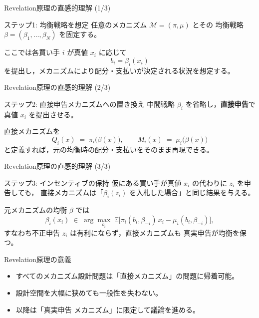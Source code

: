 \documentclass[dvipdfmx,autodetect-engine]{beamer}
\begin{document}
\begin{frame}{Revelation原理の直感的理解 (1/3)}
  \begin{block}{ステップ1: 均衡戦略を想定}
    任意のメカニズム $\mathcal{M}=(\pi,\mu)$ とその
    均衡戦略 $\beta=(\beta_1,\dots,\beta_N)$ を固定する。
  \end{block}
  \vspace{1ex}
  ここでは各買い手 $i$ が真値 $x_i$ に応じて
  \[
    b_i = \beta_i(x_i)
  \]
  を提出し，メカニズムにより配分・支払いが決定される状況を想定する。
\end{frame}

\begin{frame}{Revelation原理の直感的理解 (2/3)}
  \begin{block}{ステップ2: 直接申告メカニズムへの置き換え}
    中間戦略 $\beta_i$ を省略し，\textbf{直接申告}で
    真値 $x_i$ を提出させる。
  \end{block}
  \vspace{1ex}
  直接メカニズムを
  \[
    Q_i(x)\;=\;\pi_i\bigl(\beta(x)\bigr),\qquad 
    M_i(x)\;=\;\mu_i\bigl(\beta(x)\bigr)
  \]
  と定義すれば，元の均衡時の配分・支払いをそのまま再現できる。
\end{frame}

\begin{frame}{Revelation原理の直感的理解 (3/3)}
  \begin{block}{ステップ3: インセンティブの保持}
    仮にある買い手が真値 $x_i$ の代わりに $z_i$ を申告しても，
    直接メカニズムは「\(\beta_i(z_i)\) を入札した場合」と同じ結果を与える。
  \end{block}
  \vspace{1ex}
  元メカニズムの均衡 $\beta$ では
  \[
    \beta_i(x_i)\;\in\;\arg\max_{b_i}\;
    \mathbb{E}\bigl[\pi_i(b_i,\beta_{-i})\,x_i
      -\mu_i(b_i,\beta_{-i})\bigr],
  \]
  すなわち不正申告 \(z_i\) は有利にならず，直接メカニズムも
  真実申告が均衡を保つ。
\end{frame}

\begin{frame}{Revelation原理の意義}
  \begin{itemize}
    \item すべてのメカニズム設計問題は「直接メカニズム」の問題に帰着可能。
    \item 設計空間を大幅に狭めても一般性を失わない。
    \item 以降は「真実申告
    メカニズム」に限定して議論を進める。
  \end{itemize}
\end{frame}
\end{document}
